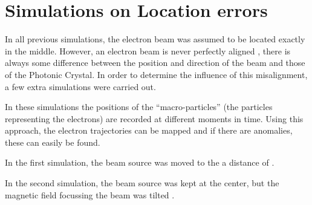 \chapter{Simulations on Location errors}
\label{sec:alesresults}
In all previous simulations, the electron beam was assumed to be located exactly in the middle. However, an electron beam is never perfectly aligned , there is always some difference between the position and direction of the beam and those of the Photonic Crystal.
In order to determine the influence of this misalignment, a few extra simulations were carried out.

In these simulations the positions of the ``macro-particles'' (the particles representing the electrons) are recorded at different moments in time. Using this approach, the electron trajectories can be mapped and if there are anomalies, these can easily be found.

In the first simulation, the beam source was moved to the  a distance of .

In the second simulation, the beam source was kept at the center, but the magnetic field focussing the beam was tilted .
